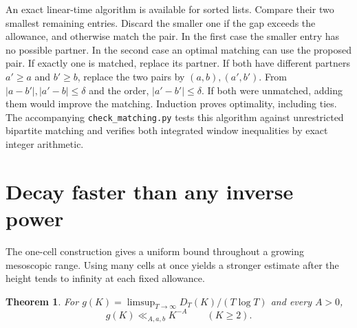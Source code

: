 \documentclass[11pt]{article}
\newtheorem{theorem}{Theorem}[section]
\begin{document}
An exact linear-time algorithm is available for sorted lists. Compare their
two smallest remaining entries. Discard the smaller one if the gap exceeds
the allowance, and otherwise match the pair. In the first case the smaller
entry has no possible partner. In the second case an optimal matching can use
the proposed pair. If exactly one is matched, replace its partner.
If both have different partners \(a'\ge a\) and \(b'\ge b\), replace the
two pairs by \((a,b),(a',b')\). From \(|a-b'|,|a'-b|\le\delta\) and the order,
\(|a'-b'|\le\delta\). If both were unmatched, adding them would improve the
matching. Induction proves optimality, including ties.
The accompanying \texttt{check\_matching.py} tests this algorithm against
unrestricted bipartite matching and verifies both integrated window inequalities
by exact integer arithmetic.

\section{Decay faster than any inverse power}

The one-cell construction gives a uniform bound throughout a growing
mesoscopic range. Using many cells at once yields a stronger estimate
after the height tends to infinity at each fixed allowance.

\begin{theorem}\label{th:rapid}
For \(g(K)=\limsup_{T\to\infty}D_T(K)/(T\log T)\) and every \(A>0\),
\[
                    g(K)\ll_{A,a,b} K^{-A}\qquad(K\ge2).
\]
\end{theorem}
\end{document}
